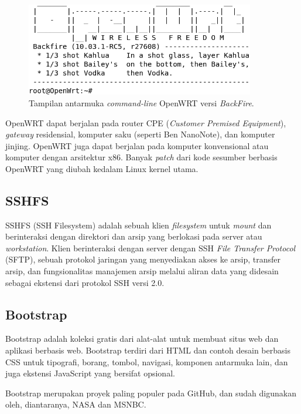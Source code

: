       \begin{figure}[ht!]
        \centering
          \includegraphics[width=10cm]{gambar/openwrt}
          \caption{Tampilan antarmuka \emph{command-line} OpenWRT versi \emph{BackFire}.}
          \label{openwrt}
      \end{figure}

    OpenWRT dapat berjalan pada router CPE (\emph{Customer Premised Equipment}), \emph{gateway} residensial, komputer saku (seperti Ben NanoNote), dan komputer jinjing. OpenWRT juga dapat berjalan pada komputer konvensional atau komputer dengan arsitektur x86. Banyak \emph{patch} dari kode sesumber berbasis OpenWRT yang diubah kedalam Linux kernel utama.

  \subsection{SSHFS}
    SSHFS (SSH Filesystem) adalah sebuah klien \emph{filesystem} untuk \emph{mount} dan berinteraksi dengan direktori dan arsip yang berlokasi pada server atau \emph{workstation}. Klien berinteraksi dengan server dengan SSH \emph{File Transfer Protocol} (SFTP), sebuah protokol jaringan yang menyediakan akses ke arsip, transfer arsip, dan fungsionalitas manajemen arsip melalui aliran data yang didesain sebagai ekstensi dari protokol SSH versi 2.0.

  \subsection{Bootstrap}
    Bootstrap adalah koleksi gratis dari alat-alat untuk membuat situs web dan aplikasi berbasis web. Bootstrap terdiri dari HTML dan contoh desain berbasis CSS untuk tipografi, borang, tombol, navigasi, komponen antarmuka lain, dan juga ekstensi JavaScript yang bersifat opsional.

    Bootstrap merupakan proyek paling populer pada GitHub, dan sudah digunakan oleh, diantaranya, NASA dan MSNBC.

